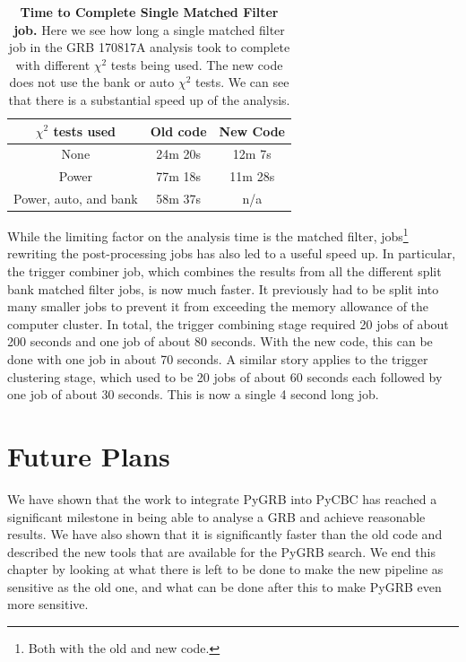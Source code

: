 \documentclass[11pt]{cuthesis}
\begin{document}
\begin{table}[h] \label{tab:inspiral speed}
\centering
\begin{tabular}{  c | c | c }
 $\chi^2$ tests used  & Old code & New Code \\ \hline                                                       
None  & 24m 20s & 12m 7s \\
Power & 77m 18s & 11m 28s \\
Power, auto, and bank & 58m 37s & n/a  \\
\end{tabular}
\caption{\textbf{Time to Complete Single Matched Filter job.} Here we see how long a single matched filter job in the GRB 170817A analysis took to complete with different $\chi^2$ tests being used. The new code does not use the bank or auto $\chi^2$ tests. We can see that there is a substantial speed up of the analysis. }
\end{table}

While the limiting factor on the analysis time is the matched filter, jobs\footnote{Both with the old and new code.} rewriting the post-processing jobs has also led to a useful speed up. In particular, the trigger combiner job, which combines the results from all the different split bank matched filter jobs, is now much faster. It previously had to be split into many smaller jobs to prevent it from exceeding the memory allowance of the computer cluster. In total, the trigger combining stage required 20 jobs of about 200 seconds and one job of about 80 seconds. With the new code, this can be done with one job in about 70 seconds. A similar story applies to the trigger clustering stage, which used to be 20 jobs of about 60 seconds each followed by one job of about 30 seconds. This is now a single 4 second long job. 


\section{Future Plans}
We have shown that the work to integrate PyGRB into PyCBC has reached a significant milestone in being able to analyse a GRB and achieve reasonable results. We have also shown that it is significantly faster than the old code and described the new tools that are available for the PyGRB search. We end this chapter by looking at what there is left to be done to make the new pipeline as sensitive as the old one, and what can be done after this to make PyGRB even more sensitive. 
\end{document}
